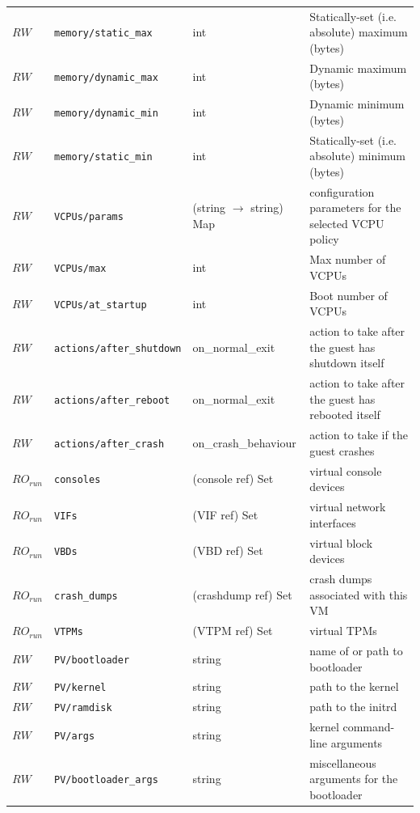 \begin{longtable}{|lllp{}|}
$\mathit{RW}$ &  {\tt memory/static\_max} & int & Statically-set (i.e. absolute) maximum (bytes) \\
$\mathit{RW}$ &  {\tt memory/dynamic\_max} & int & Dynamic maximum (bytes) \\
$\mathit{RW}$ &  {\tt memory/dynamic\_min} & int & Dynamic minimum (bytes) \\
$\mathit{RW}$ &  {\tt memory/static\_min} & int & Statically-set (i.e. absolute) minimum (bytes) \\
$\mathit{RW}$ &  {\tt VCPUs/params} & (string $\rightarrow$ string) Map & configuration parameters for the selected VCPU policy \\
$\mathit{RW}$ &  {\tt VCPUs/max} & int & Max number of VCPUs \\
$\mathit{RW}$ &  {\tt VCPUs/at\_startup} & int & Boot number of VCPUs \\
$\mathit{RW}$ &  {\tt actions/after\_shutdown} & on\_normal\_exit & action to take after the guest has shutdown itself \\
$\mathit{RW}$ &  {\tt actions/after\_reboot} & on\_normal\_exit & action to take after the guest has rebooted itself \\
$\mathit{RW}$ &  {\tt actions/after\_crash} & on\_crash\_behaviour & action to take if the guest crashes \\
$\mathit{RO}_\mathit{run}$ &  {\tt consoles} & (console ref) Set & virtual console devices \\
$\mathit{RO}_\mathit{run}$ &  {\tt VIFs} & (VIF ref) Set & virtual network interfaces \\
$\mathit{RO}_\mathit{run}$ &  {\tt VBDs} & (VBD ref) Set & virtual block devices \\
$\mathit{RO}_\mathit{run}$ &  {\tt crash\_dumps} & (crashdump ref) Set & crash dumps associated with this VM \\
$\mathit{RO}_\mathit{run}$ &  {\tt VTPMs} & (VTPM ref) Set & virtual TPMs \\
$\mathit{RW}$ &  {\tt PV/bootloader} & string & name of or path to bootloader \\
$\mathit{RW}$ &  {\tt PV/kernel} & string & path to the kernel \\
$\mathit{RW}$ &  {\tt PV/ramdisk} & string & path to the initrd \\
$\mathit{RW}$ &  {\tt PV/args} & string & kernel command-line arguments \\
$\mathit{RW}$ &  {\tt PV/bootloader\_args} & string & miscellaneous arguments for the bootloader \\

\end{longtable}
